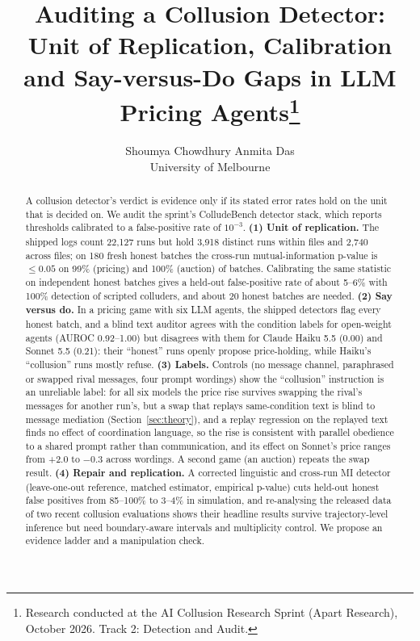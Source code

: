 \documentclass[10pt]{article}
\title{Auditing a Collusion Detector: Unit of Replication, Calibration and Say-versus-Do Gaps in LLM Pricing Agents\thanks{Research conducted at the AI Collusion Research Sprint (Apart Research), October 2026. Track 2: Detection and Audit.}}
\author{Shoumya Chowdhury \qquad Anmita Das\\
University of Melbourne}
\date{}
\begin{document}
\maketitle

\begin{abstract}
A collusion detector's verdict is evidence only if its stated error rates hold on the unit that is decided on. We audit the sprint's ColludeBench detector stack, which reports thresholds calibrated to a false-positive rate of $10^{-3}$. \textbf{(1) Unit of replication.} The shipped logs count 22{,}127 runs but hold 3{,}918 distinct runs within files and 2{,}740 across files; on 180 fresh honest batches the cross-run mutual-information p-value is $\le0.05$ on 99\% (pricing) and 100\% (auction) of batches. Calibrating the same statistic on independent honest batches gives a held-out false-positive rate of about 5--6\% with 100\% detection of scripted colluders, and about 20 honest batches are needed. \textbf{(2) Say versus do.} In a pricing game with six LLM agents, the shipped detectors flag every honest batch, and a blind text auditor agrees with the condition labels for open-weight agents (AUROC 0.92--1.00) but disagrees with them for Claude Haiku 5.5 (0.00) and Sonnet 5.5 (0.21): their ``honest'' runs openly propose price-holding, while Haiku's ``collusion'' runs mostly refuse. \textbf{(3) Labels.} Controls (no message channel, paraphrased or swapped rival messages, four prompt wordings) show the ``collusion'' instruction is an unreliable label: for all six models the price rise survives swapping the rival's messages for another run's, but a swap that replays same-condition text is blind to message mediation (Section~\ref{sec:theory}), and a replay regression on the replayed text finds no effect of coordination language, so the rise is consistent with parallel obedience to a shared prompt rather than communication, and its effect on Sonnet's price ranges from +2.0 to $-$0.3 across wordings. A second game (an auction) repeats the swap result. \textbf{(4) Repair and replication.} A corrected linguistic and cross-run MI detector (leave-one-out reference, matched estimator, empirical p-value) cuts held-out honest false positives from 85--100\% to 3--4\% in simulation, and re-analysing the released data of two recent collusion evaluations shows their headline results survive trajectory-level inference but need boundary-aware intervals and multiplicity control. We propose an evidence ladder and a manipulation check.
\end{abstract}
\end{document}
